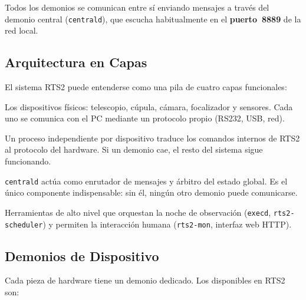 \documentclass[12pt,a4paper,titlepage]{article}
\begin{document}
Todos los demonios se comunican entre sí enviando mensajes a través del demonio central (\texttt{centrald}), que escucha habitualmente en el \textbf{puerto~8889} de la red local.

\subsection{Arquitectura en Capas}

El sistema RTS2 puede entenderse como una pila de cuatro capas funcionales:

\begin{description}[leftmargin=3cm, style=nextline]
  \item[Capa de Hardware] Los dispositivos físicos: telescopio, cúpula, cámara, focalizador y sensores. Cada uno se comunica con el PC mediante un protocolo propio (RS232, USB, red).

  \item[Capa de Demonios] Un proceso independiente por dispositivo traduce los comandos internos de RTS2 al protocolo del hardware. Si un demonio cae, el resto del sistema sigue funcionando.

  \item[Capa Central] \texttt{centrald} actúa como enrutador de mensajes y árbitro del estado global. Es el único componente indispensable: sin él, ningún otro demonio puede comunicarse.

  \item[Capa de Automatización e Interfaces] Herramientas de alto nivel que orquestan la noche de observación (\texttt{execd}, \texttt{rts2-scheduler}) y permiten la interacción humana (\texttt{rts2-mon}, interfaz web HTTP).
\end{description}

\subsection{Demonios de Dispositivo}

Cada pieza de hardware tiene un demonio dedicado. Los disponibles en RTS2 son:
\end{document}
